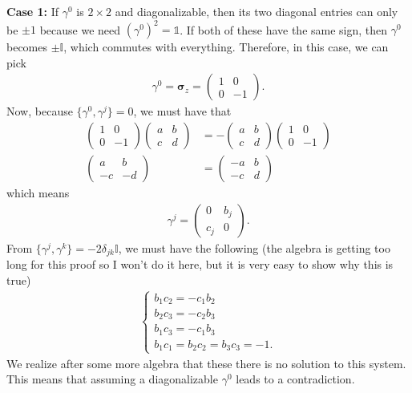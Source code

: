 \documentclass{book}
\theoremstyle{definition}
\newcommand{\nn}{\nonumber}
\begin{document}
\textbf{Case 1:} If $\gamma^0$ is $2\times 2$ and diagonalizable, then its two diagonal entries can only be $\pm 1$ because we need $(\gamma^0)^2 = \mathds{1}$. If both of these have the same sign, then $\gamma^0$ becomes $\pm \mathbb{I}$, which commutes with everything. Therefore, in this case, we can pick
\begin{align}
\gamma^0 = \mathbf{\sigma}_z = \begin{pmatrix}
1 & 0\\ 0 & -1
\end{pmatrix}.
\end{align}
Now, because $\{\gamma^0, \gamma^j \} = 0$, we must have that
\begin{align}
\begin{pmatrix}
1 & 0 \\ 0 & -1
\end{pmatrix}\begin{pmatrix}
a & b \\ c & d
\end{pmatrix} &= -\begin{pmatrix}
a & b \\ c & d
\end{pmatrix}\begin{pmatrix}
1 & 0 \\ 0 & -1
\end{pmatrix}\nn\\
\begin{pmatrix}
a & b \\ -c & -d 
\end{pmatrix}
&=
\begin{pmatrix}
-a & b \\ -c & d
\end{pmatrix}
\end{align}
which means
\begin{align}
\gamma^j = \begin{pmatrix}
0 & b_j \\ c_j & 0
\end{pmatrix}.
\end{align}
From $\{ \gamma^j, \gamma^k \} = -2\delta_{jk}\mathbb{I}$, we must have the following (the algebra is getting too long for this proof so I won't do it here, but it is very easy to show why this is true)
\begin{align}
\begin{cases}
b_1 c_2 = -c_1 b_2\\
b_2 c_3 = -c_2 b_3\\
b_1 c_3 = -c_1 b_3\\
b_1c_1 = b_2c_2 = b_3c_3 = -1.
\end{cases}
\end{align}
We realize after some more algebra that these there is no solution to this system. This means that assuming a diagonalizable $\gamma^0$ leads to a contradiction. \\
\end{document}
